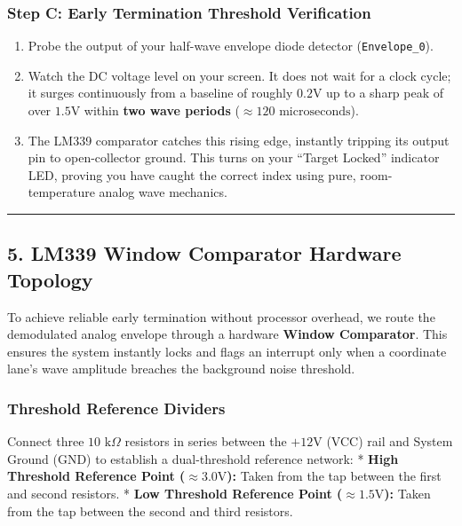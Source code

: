 \documentclass[
]{article}
\providecommand{\tightlist}{%
  \setlength{\itemsep}{0pt}\setlength{\parskip}{0pt}}
\begin{document}
\subsubsection{Step C: Early Termination Threshold
Verification}\label{step-c-early-termination-threshold-verification}

\begin{enumerate}
\def\labelenumi{\arabic{enumi}.}
\tightlist
\item
  Probe the output of your half-wave envelope diode detector
  (\texttt{Envelope\_0}).
\item
  Watch the DC voltage level on your screen. It does not wait for a
  clock cycle; it surges continuously from a baseline of roughly
  \(0.2\text{V}\) up to a sharp peak of over \(1.5\text{V}\) within
  \textbf{two wave periods} (\(\approx 120\text{ microseconds}\)).
\item
  The LM339 comparator catches this rising edge, instantly tripping its
  output pin to open-collector ground. This turns on your ``Target
  Locked'' indicator LED, proving you have caught the correct index
  using pure, room-temperature analog wave mechanics.
\end{enumerate}

\begin{center}\rule{0.5\linewidth}{0.5pt}\end{center}

\subsection{5. LM339 Window Comparator Hardware
Topology}\label{lm339-window-comparator-hardware-topology}

To achieve reliable early termination without processor overhead, we
route the demodulated analog envelope through a hardware \textbf{Window
Comparator}. This ensures the system instantly locks and flags an
interrupt only when a coordinate lane's wave amplitude breaches the
background noise threshold.

\subsubsection{Threshold Reference
Dividers}\label{threshold-reference-dividers}

Connect three \(10\text{ k}\Omega\) resistors in series between the
\(+12\text{V}\) (VCC) rail and System Ground (GND) to establish a
dual-threshold reference network: * \textbf{High Threshold Reference
Point (\(\approx 3.0\text{V}\)):} Taken from the tap between the first
and second resistors. * \textbf{Low Threshold Reference Point
(\(\approx 1.5\text{V}\)):} Taken from the tap between the second and
third resistors.
\end{document}
